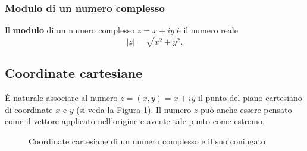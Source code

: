 \documentclass{book}
\begin{document}
\subsubsection{Modulo di un numero complesso}
\noindent\begin{minipage}{\textwidth}
    \begin{definition}
        Il \textbf{modulo} di un numero complesso \( z = x + iy \) è il numero reale
        \[ |z| = \sqrt{x^2 + y^2}. \]
    \end{definition}
\end{minipage}
\subsection{Coordinate cartesiane}
È naturale associare al numero \( z = (x, y) = x + iy \) il punto del piano cartesiano
di coordinate \( x \) e \( y \) (si veda la Figura \ref{fig:cartesiane}). Il numero \( z \) può anche essere
pensato come il vettore applicato nell'origine e avente tale punto come estremo.
\begin{figure}[H]
    \centering
    \caption{Coordinate cartesiane di un numero complesso e il suo coniugato}
    \label{fig:cartesiane}
\end{figure}
\end{document}
